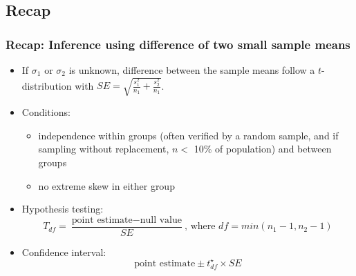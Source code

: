 \subsection{Recap}


\begin{frame}
\frametitle{Recap: Inference using difference of two small sample means}

\begin{itemize}

\item If $\sigma_1$ or $\sigma_2$ is unknown, difference between the sample means follow a $t$-distribution with $SE = \sqrt{ \frac{s_1^2}{n_1} + \frac{s_2^2}{n_1} }$.

\pause

\item Conditions: 
\begin{itemize}
\item independence within groups (often verified by a random sample, and if sampling without replacement, $n < $ 10\% of population) and between groups
\item no extreme skew in either group
\end{itemize}

\pause

\item Hypothesis testing: 
\[ T_{df} = \frac{\text{point estimate} - \text{null value}}{SE}\text{, where }df = min(n_1 - 1, n_2 - 1) \]

\pause

\item Confidence interval:
\[ \text{point estimate} \pm t_{df}^\star \times SE \]

\end{itemize}

\end{frame}

